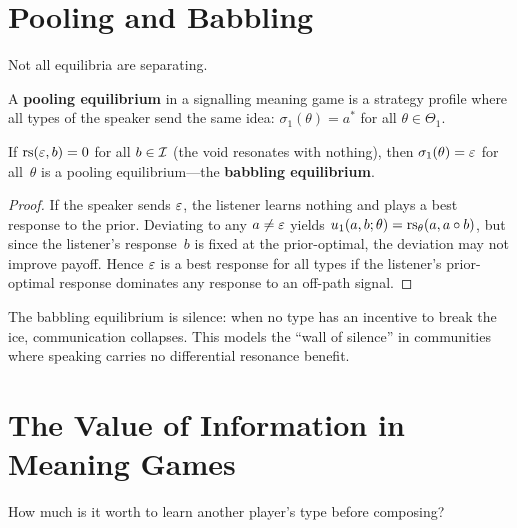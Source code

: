 \section{Pooling and Babbling}
\label{sec:pooling}

Not all equilibria are separating.

\begin{definition}
\label{def:pooling}
A \textbf{pooling equilibrium} in a signalling meaning game is
a strategy profile where all types of the speaker send the same
idea: $\sigma_1(\theta) = a^*$ for all $\theta \in \Theta_1$.
\end{definition}

\begin{proposition}
\label{prop:void-pooling}
If $\mathrm{rs}(\varepsilon, b) = 0$ for all $b \in \mathcal{I}$ (the void resonates
with nothing), then $\sigma_1(\theta) = \varepsilon$ for all~$\theta$
is a pooling equilibrium---the \textbf{babbling equilibrium}.
\end{proposition}

\begin{proof}
If the speaker sends $\varepsilon$, the listener learns nothing and
plays a best response to the prior.  Deviating to any $a \neq \varepsilon$
yields $u_1(a,b;\theta) = \mathrm{rs}_\theta(a, a\circ b)$, but since
the listener's response~$b$ is fixed at the prior-optimal, the
deviation may not improve payoff.  Hence $\varepsilon$ is a best
response for all types if the listener's prior-optimal response
dominates any response to an off-path signal.
\end{proof}

\begin{interpretation}
The babbling equilibrium is silence: when no type has an incentive
to break the ice, communication collapses.  This models the
``wall of silence'' in communities where speaking carries
no differential resonance benefit.
\end{interpretation}

\section{The Value of Information in Meaning Games}
\label{sec:value-info}

How much is it worth to learn another player's type before
composing?

